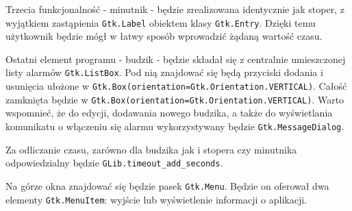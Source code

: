 \documentclass[11pt]{article}
\begin{document}
    Trzecia funkcjonalność - minutnik - będzie zrealizowana identycznie jak stoper, z wyjątkiem
    zastąpienia \texttt{Gtk.Label} obiektem klasy \texttt{Gtk.Entry}. Dzięki temu użytkownik będzie mógł
    w łatwy sposób wprowadzić żądaną wartość czasu.

    Ostatni element programu - budzik - będzie składał się z centralnie umieszczonej listy alarmów
    \texttt{Gtk.ListBox}. Pod nią znajdować się będą przyciski dodania i usunięcia ułożone w
    \texttt{Gtk.Box(orientation=Gtk.Orientation.VERTICAL)}. Całość zamknięta będzie w
    \texttt{Gtk.Box(orientation=Gtk.Orientation.VERTICAL)}. Warto wspomnieć, że do edycji,
    dodawania nowego budzika, a także do wyświetlania komunikatu o włączeniu się alarmu wykorzystywany będzie
    \texttt{Gtk.MessageDialog}.

    Za odliczanie czasu, zarówno dla budzika jak i stopera czy minutnika odpowiedzialny będzie \texttt{GLib.timeout\_add\_seconds}.

    Na górze okna znajdować się będzie pasek \texttt{Gtk.Menu}. Będzie on oferował dwa elementy \texttt{Gtk.MenuItem}:
    wyjście lub wyświetlenie informacji o aplikacji.
\end{document}
